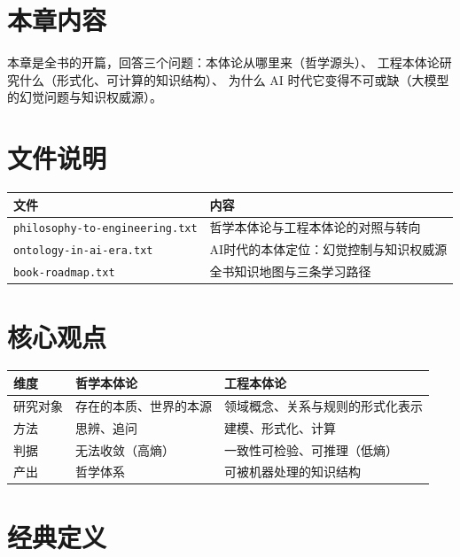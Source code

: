 
\section{本章内容}

本章是全书的开篇，回答三个问题：本体论从哪里来（哲学源头）、
工程本体论研究什么（形式化、可计算的知识结构）、
为什么 AI 时代它变得不可或缺（大模型的幻觉问题与知识权威源）。

\section{文件说明}

\begin{center}
\begin{tabularx}{\linewidth}{@{}XX@{}}
\toprule
\textbf{文件} & \textbf{内容} \\
\midrule
\texttt{philosophy-to-engineering.txt} & 哲学本体论与工程本体论的对照与转向 \\
\texttt{ontology-in-ai-era.txt} & AI时代的本体定位：幻觉控制与知识权威源 \\
\texttt{book-roadmap.txt} & 全书知识地图与三条学习路径 \\
\bottomrule
\end{tabularx}
\end{center}

\section{核心观点}

\begin{center}
\begin{tabularx}{\linewidth}{@{}lXX@{}}
\toprule
\textbf{维度} & \textbf{哲学本体论} & \textbf{工程本体论} \\
\midrule
研究对象 & 存在的本质、世界的本源 & 领域概念、关系与规则的形式化表示 \\
方法 & 思辨、追问 & 建模、形式化、计算 \\
判据 & 无法收敛（高熵） & 一致性可检验、可推理（低熵） \\
产出 & 哲学体系 & 可被机器处理的知识结构 \\
\bottomrule
\end{tabularx}
\end{center}

\section{经典定义}

